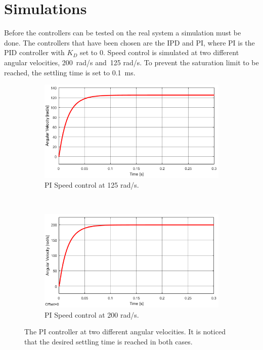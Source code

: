 \section{Simulations}
Before the controllers can be tested on the real system a simulation must be done. The controllers that have been chosen are the IPD and PI, where PI is the PID controller with $K_D$ set to 0. Speed control is simulated at two different angular velocities, 200~rad/s and~125 rad/s. To prevent the saturation limit to be reached, the settling time is set to 0.1~ms.
\begin{figure}[h!]
	\centering
	\begin{subfigure}[b]{0.45\textwidth}
		\includegraphics[width=\textwidth]{graphics/PI_single125}
		\caption{PI Speed control at 125 rad/s.}
		\label{fig:pisingle125}
	\end{subfigure}
	~ %
	\begin{subfigure}[b]{0.45\textwidth}
		\includegraphics[width=\textwidth]{graphics/PI_single200}
		\caption{PI Speed control at 200 rad/s.}
		\label{fig:pisingle200}
	\end{subfigure}
	\caption{The PI controller at two different angular velocities. It is noticed that the desired settling time is reached in both cases.}\label{fig:pisingle}
\end{figure}






